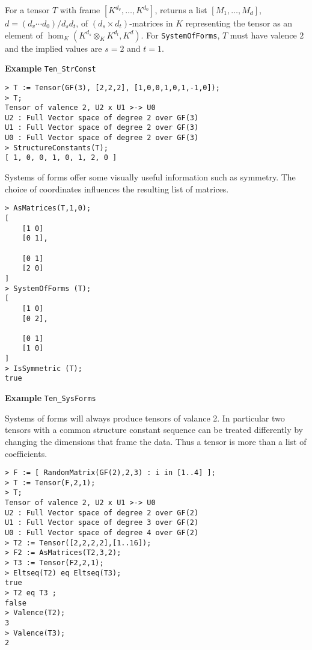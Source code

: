 For a tensor $T$ with frame $[K^{d_v},\dots,K^{d_0}]$, 
returns a list $[M_1,\dots,M_d]$, $d=(d_v\cdots d_0)/d_s d_t$, 
of $(d_s\times d_t)$-matrices in $K$ representing the tensor
as an element of $\hom_K(K^{d_s}\otimes_K K^{d_t},K^d)$.
For {\tt SystemOfForms}, $T$ must have valence $2$ and the implied values
are $s=2$ and $t=1$.

\medskip
\begin{framed}{\bf Example} {\tt Ten\_StrConst}\\
{\small
\begin{lstlisting}[frame=single,basicstyle=\ttfamily\color{black!30!
teal},backgroundcolor=\color{white!70!gray}]
> T := Tensor(GF(3), [2,2,2], [1,0,0,1,0,1,-1,0]);
> T;
Tensor of valence 2, U2 x U1 >-> U0
U2 : Full Vector space of degree 2 over GF(3)
U1 : Full Vector space of degree 2 over GF(3)
U0 : Full Vector space of degree 2 over GF(3)
> StructureConstants(T);
[ 1, 0, 0, 1, 0, 1, 2, 0 ]
\end{lstlisting}
Systems of forms offer some visually useful information such as
symmetry.
The choice of coordinates influences the resulting list of matrices.
\begin{lstlisting}[frame=single,basicstyle=\ttfamily\color{black!30!
teal},backgroundcolor=\color{white!70!gray}]
> AsMatrices(T,1,0);
[
    [1 0]
    [0 1],

    [0 1]
    [2 0]
]
> SystemOfForms (T);
[
    [1 0]
    [0 2],

    [0 1]
    [1 0]
]
> IsSymmetric (T);
true
\end{lstlisting}
}
\end{framed}

\medskip
\begin{framed} {\bf Example} {\tt Ten\_SysForms}\\
{\small
Systems of forms will always produce tensors of valance 2.  In particular
two tensors with a common structure constant sequence can be treated differently by
changing the dimensions that frame the data.  Thus a tensor is more than a list of coefficients.
\begin{lstlisting}[frame=single,basicstyle=\ttfamily\color{black!30!
teal},backgroundcolor=\color{white!70!gray}]
> F := [ RandomMatrix(GF(2),2,3) : i in [1..4] ];
> T := Tensor(F,2,1);
> T;
Tensor of valence 2, U2 x U1 >-> U0
U2 : Full Vector space of degree 2 over GF(2)
U1 : Full Vector space of degree 3 over GF(2)
U0 : Full Vector space of degree 4 over GF(2)
> T2 := Tensor([2,2,2,2],[1..16]);
> F2 := AsMatrices(T2,3,2);
> T3 := Tensor(F2,2,1);
> Eltseq(T2) eq Eltseq(T3);
true
> T2 eq T3 ;
false
> Valence(T2);
3
> Valence(T3);
2
\end{lstlisting}
}
\end{framed}


